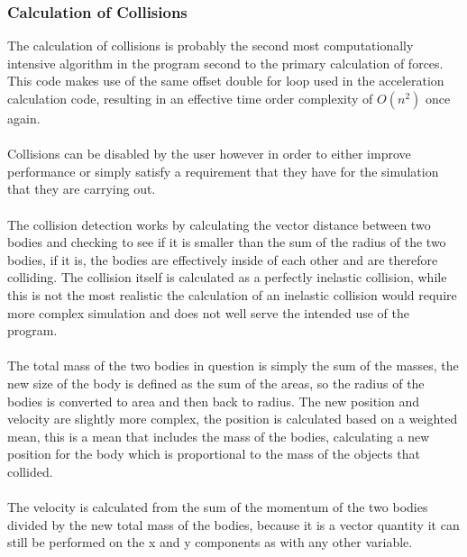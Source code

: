 \subsubsection{Calculation of Collisions}
The calculation of collisions is probably the second most computationally intensive algorithm in the program second to the primary calculation of forces. This code makes use of the same offset double for loop used in the acceleration calculation code, resulting in an effective time order complexity of $O(n^2)$ once again.

\paragraph{}
Collisions can be disabled by the user however in order to either improve performance or simply satisfy a requirement that they have for the simulation that they are carrying out. 

\paragraph{}
The collision detection works by calculating the vector distance between two bodies and checking to see if it is smaller than the sum of the radius of the two bodies, if it is, the bodies are effectively inside of each other and are therefore colliding. The collision itself is calculated as a perfectly inelastic collision, while this is not the most realistic the calculation of an inelastic collision would require more complex simulation and does not well serve the intended use of the program. 

\paragraph{}
The total mass of the two bodies in question is simply the sum of the masses, the new size of the body is defined as the sum of the areas, so the radius of the bodies is converted to area and then back to radius. The new position and velocity are slightly more complex, the position is calculated based on a weighted mean, this is a mean that includes the mass of the bodies, calculating a new position for the body which is proportional to the mass of the objects that collided.

\paragraph{}
The velocity is calculated from the sum of the momentum of the two bodies divided by the new total mass of the bodies, because it is a vector quantity it can still be performed on the x and y components as with any other variable.

